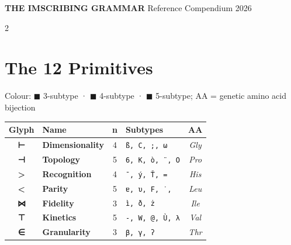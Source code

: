 \documentclass[10pt,a4paper]{article}
\begin{document}

\begin{headerbox}
  {\Large\bfseries\color{white} THE IMSCRIBING GRAMMAR}
  \hfill
  {\normalsize\color{white!80!hdrblue} Reference Compendium \textbullet{} 2026}
\end{headerbox}

\vspace{4pt}
\begin{multicols}{2}

  \section*{The 12 Primitives}
  {\footnotesize Colour: {\color{g3col}$\blacksquare$} 3-subtype ·
  {\color{g4col}$\blacksquare$} 4-subtype ·
  {\color{g5col}$\blacksquare$} 5-subtype; AA = genetic amino acid bijection}
  \vspace{3pt}
  \begin{tabular}{@{}c l c l c@{}}
  \toprule
  \textbf{Glyph} & \textbf{Name} & \textbf{n} & \textbf{Subtypes} & \textbf{AA} \\
  \midrule
    \rowcolor{g4col!12}\textcolor{g4col}{\textbf{\large ⊢}} & \textcolor{g4col}{\textbf{Dimensionality}} & 4 & \texttt{\small ß, C, ;, ω} & \textit{\small Gly} \\
    \rowcolor{g5col!12}\textcolor{g5col}{\textbf{\large ⊣}} & \textcolor{g5col}{\textbf{Topology}} & 5 & \texttt{\small 6, K, ò, ¨, O} & \textit{\small Pro} \\
    \rowcolor{g4col!12}\textcolor{g4col}{\textbf{\large >}} & \textcolor{g4col}{\textbf{Recognition}} & 4 & \texttt{\small ¯, ý, Ť, =} & \textit{\small His} \\
    \rowcolor{g5col!12}\textcolor{g5col}{\textbf{\large <}} & \textcolor{g5col}{\textbf{Parity}} & 5 & \texttt{\small ɐ, υ, F, ˙, }} & \textit{\small Leu} \\
    \rowcolor{g3col!12}\textcolor{g3col}{\textbf{\large ⋈}} & \textcolor{g3col}{\textbf{Fidelity}} & 3 & \texttt{\small ì, ð, ż} & \textit{\small Ile} \\
    \rowcolor{g5col!12}\textcolor{g5col}{\textbf{\large ⊤}} & \textcolor{g5col}{\textbf{Kinetics}} & 5 & \texttt{\small -, W, @, Ù, λ} & \textit{\small Val} \\
    \rowcolor{g3col!12}\textcolor{g3col}{\textbf{\large ∈}} & \textcolor{g3col}{\textbf{Granularity}} & 3 & \texttt{\small β, γ, ʔ} & \textit{\small Thr} \\

\end{tabular}
\end{multicols}
\end{document}
